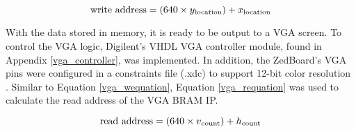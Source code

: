 \begin{equation}
	\textrm{write address} = (640\times{}y\textsubscript{location})+ x\textsubscript{location}
	\label{vga_wequation}
\end{equation}

\par
With the data stored in memory, it is ready to be output to a VGA screen. To control the VGA logic, Digilent's VHDL VGA controller module, found in Appendix \ref{vga_controller}, was implemented. In addition, the ZedBoard's VGA pins were configured in a constraints file (.xdc) to support 12-bit color resolution \cite{zedboard_datasheet}. Similar to Equation \ref{vga_wequation}, Equation \ref{vga_requation} was used to calculate the read address of the VGA BRAM IP.

\begin{equation}
	\textrm{read address} = (640\times{}v\textsubscript{count})+ h\textsubscript{count}
	\label{vga_requation}
\end{equation}


